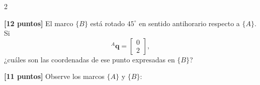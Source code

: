 \documentclass[10pt]{article}
\begin{document}
\begin{multicols}{2}

        \begin{question}
            \textbf{[12 puntos]} El marco $\{B\}$ está rotado $45^\circ$ en sentido
            antihorario respecto a $\{A\}$. Si
            \[
            {}^A\mathbf{q}=\begin{bmatrix}0\\2\end{bmatrix},
            \]
            ¿cuáles son las coordenadas de ese punto expresadas en $\{B\}$?

            \begin{inlineanswers}
            \end{inlineanswers}
        \end{question}


        \begin{question}
            \textbf{[11 puntos]} Observe los marcos $\{A\}$ y $\{B\}$:


\end{question}
\end{multicols}
\end{document}

